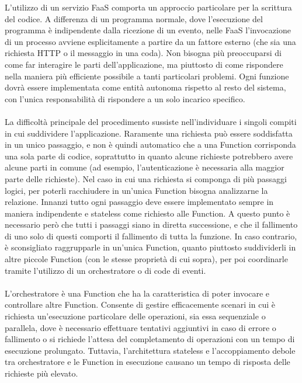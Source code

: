 L'utilizzo di un servizio FaaS comporta un approccio particolare per la scrittura del codice.
A differenza di un programma normale, 
dove l'esecuzione del programma è indipendente dalla ricezione di un evento,
nelle FaaS l'invocazione di un processo avviene esplicitamente a partire da un fattore esterno
(che sia una richiesta HTTP o il messaggio in una coda). 
Non bisogna più preoccuparsi di come far interagire le parti dell'applicazione,
ma piuttosto di come rispondere nella maniera più efficiente possibile a tanti particolari problemi.
Ogni funzione dovrà essere implementata come entità autonoma rispetto al resto del sistema,
con l'unica responsabilità di rispondere a un solo incarico specifico.\\
\\
La difficoltà principale del procedimento sussiste nell'individuare i singoli compiti 
in cui suddividere l'applicazione.
Raramente una richiesta può essere soddisfatta in un unico passaggio, 
e non è quindi automatico che a una Function corrisponda una sola parte di codice, 
soprattutto in quanto alcune richieste potrebbero avere alcune parti in comune
(ad esempio, l'autenticazione è necessaria alla maggior parte delle richieste).
Nel caso in cui una richiesta si componga di più passaggi logici, 
per poterli racchiudere in un'unica Function bisogna analizzarne la relazione.
Innanzi tutto ogni passaggio deve essere implementato sempre in maniera indipendente e stateless
come richiesto alle Function.
A questo punto è necessario però che tutti i passaggi siano in diretta successione, 
e che il fallimento di uno solo di questi comporti il fallimento di tutta la funzione.
In caso contrario, è sconsigliato raggrupparle in un'unica Function, 
quanto piuttosto suddividerli in altre piccole Function (con le stesse proprietà di cui sopra),
per poi coordinarle tramite l'utilizzo di un orchestratore o di code di eventi.\\
\\
L'orchestratore è una Function che ha la caratteristica 
di poter invocare e controllare altre Function.
Consente di gestire efficacemente scenari 
in cui è richiesta un'esecuzione particolare delle operazioni, sia essa sequenziale o parallela,
dove è necessario effettuare tentativi aggiuntivi in caso di errore o fallimento o 
si richiede l'attesa del completamento di operazioni con un tempo di esecuzione prolungato.
Tuttavia, l'architettura stateless e l'accoppiamento debole tra orchestratore
e le Function in esecuzione causano un tempo di risposta delle richieste più elevato.\\
